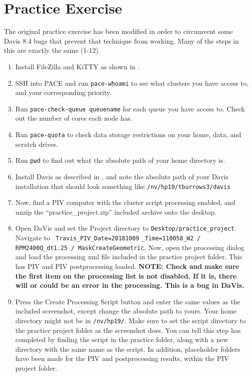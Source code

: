 \documentclass{article}
\newcommand{\quotes}[1]{``#1''}
\begin{document}
    \section{Practice Exercise}
    \label{PracticeExercise}
    The original practice exercise has been modified in order to circumvent some Davis 8.4 bugs that prevent that technique from working.  Many of the steps in this are exactly the same (1-12)
    \begin{enumerate}
        \item Install FileZilla and KiTTY as shown in .
    	\item SSH into PACE and run \texttt{pace-whoami} to see what clusters you have access to, and your corresponding priority.
    	\item Run \texttt{pace-check-queue queuename} for each queue you have access to. Check out the number of cores each node has.
    	\item Run \texttt{pace-quota} to check data storage restrictions on your home, data, and scratch drives.
    	\item Run \texttt{pwd} to find out what the absolute path of your home directory is.
    	\item Install Davis as described in , and note the absolute path of your Davis installation that should look something like \texttt{/nv/hp19/tburrows3/davis}
    	\item Now, find a PIV computer with the cluster script processing enabled, and unzip the \quotes{practice\_project.zip} included archive onto the desktop.
    	\item Open DaVis and set the Project directory to \texttt{Desktop/practice\_project}.  Navigate to \texttt{ Travis\_PIV\_Date=20181009} \texttt{\_Time=110058\_W2 / RPM2400Q\_dt1.25 / MaskCreateGeometric}.  Now, open the processing dialog and load the processing xml file included in the practice project folder.  This has PIV and PIV postprocessing loaded.  \textbf{NOTE: Check and make sure the first item on the processing list is not disabled.  If it is, there will or could be an error in the processing.  This is a bug in DaVis.}
    	\item Press the Create Processing Script button and enter the same values as the included screenshot, except change the  absolute path to yours.  Your home directory might not be in \texttt{/nv/hp19/}.  Make sure to set the script directory to the practice project folder as the screenshot does.  You can tell this step has completed by finding the script in the practice folder, along with a new directory with the same name as the script.  In addition, placeholder folders have been made for the PIV and postprocessing results, within the PIV project folder.

\end{enumerate}
\end{document}
